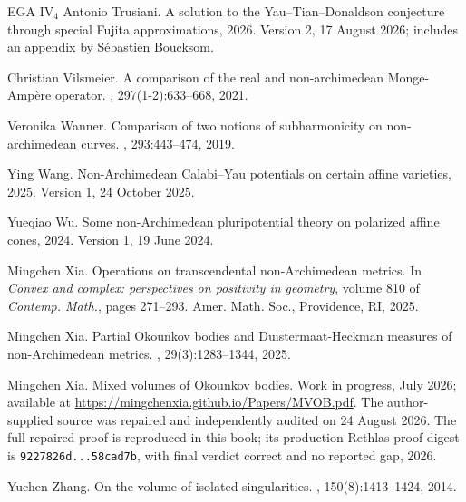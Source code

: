 \documentclass[11pt,a4paper]{article}
\theoremstyle{definition}
\theoremstyle{remark}
\begin{document}
\begin{thebibliography}{EGA IV$_4$}
Antonio Trusiani.
\newblock A solution to the {Y}au--{T}ian--{D}onaldson conjecture through
  special {F}ujita approximations, 2026.
\newblock Version 2, 17 August 2026; includes an appendix by S\'{e}bastien
  Boucksom.

Christian Vilsmeier.
\newblock A comparison of the real and non-archimedean {M}onge-{A}mp\`ere
  operator.
, 297(1-2):633--668, 2021.

Veronika Wanner.
\newblock Comparison of two notions of subharmonicity on non-archimedean
  curves.
, 293:443--474, 2019.

Ying Wang.
\newblock Non-{A}rchimedean {C}alabi--{Y}au potentials on certain affine
  varieties, 2025.
\newblock Version 1, 24 October 2025.

Yueqiao Wu.
\newblock Some non-{A}rchimedean pluripotential theory on polarized affine
  cones, 2024.
\newblock Version 1, 19 June 2024.

Mingchen Xia.
\newblock Operations on transcendental non-{A}rchimedean metrics.
\newblock In {\em Convex and complex: perspectives on positivity in geometry},
  volume 810 of {\em Contemp. Math.}, pages 271--293. Amer. Math. Soc.,
  Providence, RI, 2025.

Mingchen Xia.
\newblock Partial {O}kounkov bodies and {D}uistermaat-{H}eckman measures of
  non-{A}rchimedean metrics.
, 29(3):1283--1344, 2025.

Mingchen Xia.
\newblock Mixed volumes of {O}kounkov bodies.
\newblock Work in progress, July 2026; available at
  \url{https://mingchenxia.github.io/Papers/MVOB.pdf}. The author-supplied
  source was repaired and independently audited on 24 August 2026. The full
  repaired proof is reproduced in this book; its production Rethlas proof
  digest is \texttt{9227826d...58cad7b}, with final verdict correct and no
  reported gap, 2026.

Yuchen Zhang.
\newblock On the volume of isolated singularities.
, 150(8):1413--1424, 2014.
\end{thebibliography}
\end{document}
